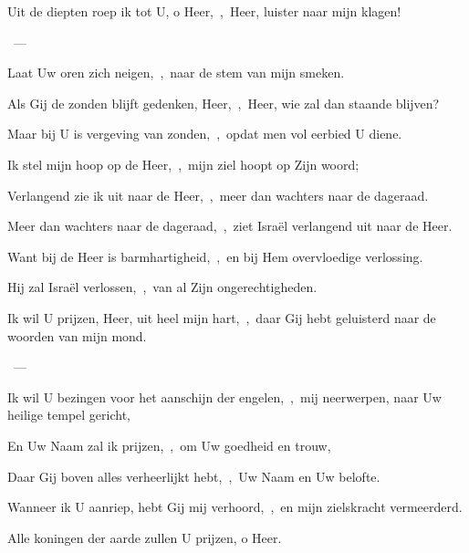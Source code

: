 \documentclass[12pt,twoside,a5paper]{article}
\begin{document}

\begin{halfparskip}
  Uit de diepten roep ik tot U, o Heer,~\sep\ Heer, luister naar mijn klagen!

  ~--- 

  Laat Uw oren zich neigen,~\sep\ naar de stem van mijn smeken.

  Als Gij de zonden blijft gedenken, Heer,~\sep\ Heer, wie zal dan staande blijven?

  Maar bij U is vergeving van zonden,~\sep\ opdat men vol eerbied U diene.

  Ik stel mijn hoop op de Heer,~\sep\ mijn ziel hoopt op Zijn woord;

  Verlangend zie ik uit naar de Heer,~\sep\ meer dan wachters naar de dageraad.

  Meer dan wachters naar de dageraad,~\sep\ ziet Israël verlangend uit naar de Heer.

  Want bij de Heer is barmhartigheid,~\sep\ en bij Hem overvloedige verlossing.

  Hij zal Israël verlossen,~\sep\ van al Zijn ongerechtigheden.
\end{halfparskip}


\begin{halfparskip}
  Ik wil U prijzen, Heer, uit heel mijn hart,~\sep\ daar Gij hebt geluisterd naar de woorden van mijn mond.

  ~--- 

  Ik wil U bezingen voor het aanschijn der engelen,~\sep\ mij neerwerpen, naar Uw heilige tempel gericht,

  En Uw Naam zal ik prijzen,~\sep\ om Uw goedheid en trouw,

  Daar Gij boven alles verheerlijkt hebt,~\sep\ Uw Naam en Uw belofte.

  Wanneer ik U aanriep, hebt Gij mij verhoord,~\sep\ en mijn zielskracht vermeerderd.

  Alle koningen der aarde zullen U prijzen, o Heer.
\end{halfparskip}

 

\end{document}
